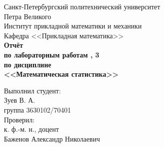 \documentclass[report1.tex]{subfiles}
\begin{document}
\begin{titlepage}
\begin{center}
	\begin{large}
		Санкт-Петербургский политехнический университет\\
		Петра Великого \\ 
		\vspace{\baselineskip}
		Институт прикладной математики и механики\\
		Кафедра <<Прикладная математика>>\\
	\vfill
	\textbf{Отчёт\\
		по лабораторным работам , 3\\
		по дисциплине\\
		<<Математическая статистика>>}
	\end{large}
\end{center}
\vfill
\flushleft
{\addtolength{\leftskip}{\linewidth / 2}
	Выполнил студент:\\
	Зуев В. А.\\
	группа 3630102/70401\\
	Проверил:\\
	к. ф.-м. н., доцент\\
	Баженов Александр Николаевич\\
}
\vfill
{}
\end{titlepage}
\end{document}
